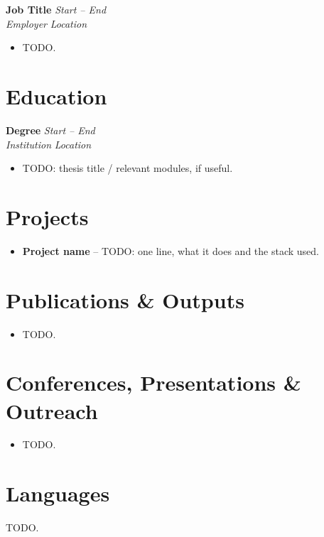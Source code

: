 \documentclass[a4paper,11pt]{article}
\newcommand{\entry}[4]{%
  \noindent\textbf{#1} \hfill \textit{#2} \\
  \textit{#3} \hfill \textit{#4} \par\vspace{1pt}
}
\begin{document}
\entry{Job Title}{Start -- End}{Employer}{Location}
\begin{itemize}[noitemsep,topsep=2pt,leftmargin=1.5em]
    \item TODO.
\end{itemize}

\section{Education}

\entry{Degree}{Start -- End}{Institution}{Location}
\begin{itemize}[noitemsep,topsep=2pt,leftmargin=1.5em]
    \item TODO: thesis title / relevant modules, if useful.
\end{itemize}

\section{Projects}
\begin{itemize}[noitemsep,topsep=2pt,leftmargin=1.5em]
    \item \textbf{Project name} -- TODO: one line, what it does and the stack used.
\end{itemize}

\section{Publications \& Outputs}
\begin{itemize}[noitemsep,topsep=2pt,leftmargin=1.5em]
    \item TODO.
\end{itemize}

\section{Conferences, Presentations \& Outreach}
\begin{itemize}[noitemsep,topsep=2pt,leftmargin=1.5em]
    \item TODO.
\end{itemize}

\section{Languages}
TODO.
\end{document}
